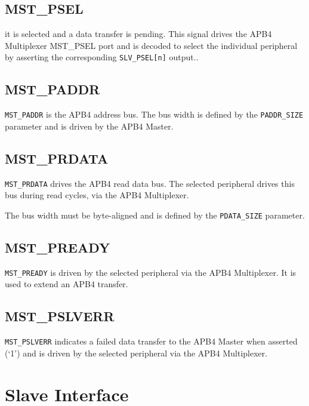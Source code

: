 \subsection{MST\_PSEL}\label{mst_psel}

it is selected and a data transfer is pending. This signal drives the
APB4 Multiplexer MST\_PSEL port and is decoded to select the individual
peripheral by asserting the corresponding \texttt{SLV\_PSEL[n]} output..

\subsection{MST\_PADDR}\label{mst_paddr}

\texttt{MST\_PADDR} is the APB4 address bus. The bus width is defined by the
\texttt{PADDR\_SIZE} parameter and is driven by the APB4 Master.

\subsection{MST\_PRDATA}\label{mst_prdata}

\texttt{MST\_PRDATA} drives the APB4 read data bus. The selected peripheral
drives this bus during read cycles, via the APB4 Multiplexer.

The bus width must be byte-aligned and is defined by the \texttt{PDATA\_SIZE}
parameter.

\subsection{MST\_PREADY}\label{mst_pready}

\texttt{MST\_PREADY} is driven by the selected peripheral via the APB4
Multiplexer. It is used to extend an APB4 transfer.

\subsection{MST\_PSLVERR}\label{mst_pslverr}

\texttt{MST\_PSLVERR} indicates a failed data transfer to the APB4 Master when
asserted (`1') and is driven by the selected peripheral via the APB4
Multiplexer.

\section{Slave Interface}\label{slave-interface}

